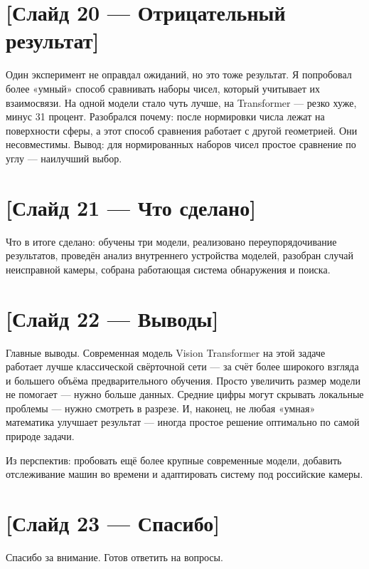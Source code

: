 \documentclass[a4paper,12pt]{article}
\begin{document}
\section*{[Слайд 20 — Отрицательный результат]}

Один эксперимент не оправдал ожиданий, но это тоже результат. Я попробовал более «умный» способ сравнивать наборы чисел, который учитывает их взаимосвязи. На одной модели стало чуть лучше, на Transformer — резко хуже, минус 31 процент. Разобрался почему: после нормировки числа лежат на поверхности сферы, а этот способ сравнения работает с другой геометрией. Они несовместимы. Вывод: для нормированных наборов чисел простое сравнение по углу — наилучший выбор.

\section*{[Слайд 21 — Что сделано]}

Что в итоге сделано: обучены три модели, реализовано переупорядочивание результатов, проведён анализ внутреннего устройства моделей, разобран случай неисправной камеры, собрана работающая система обнаружения и поиска.

\section*{[Слайд 22 — Выводы]}

Главные выводы. Современная модель Vision Transformer на этой задаче работает лучше классической свёрточной сети — за счёт более широкого взгляда и большего объёма предварительного обучения. Просто увеличить размер модели не помогает — нужно больше данных. Средние цифры могут скрывать локальные проблемы — нужно смотреть в разрезе. И, наконец, не любая «умная» математика улучшает результат — иногда простое решение оптимально по самой природе задачи.

Из перспектив: пробовать ещё более крупные современные модели, добавить отслеживание машин во времени и адаптировать систему под российские камеры.

\section*{[Слайд 23 — Спасибо]}

Спасибо за внимание. Готов ответить на вопросы.
\end{document}
